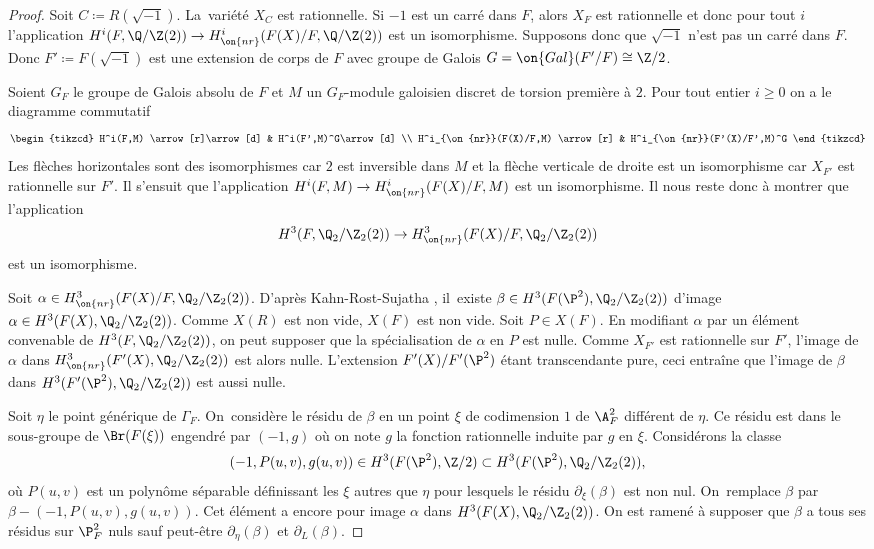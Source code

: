\begin{proof}
Soit $C\coloneqq R(\sqrt{-1})$. La~variété $X_{C}$ est rationnelle. Si $-1$ est un carré dans $F$, alors $X_F$ est rationnelle et donc pour tout $i$ l'application $H^i(F,\Q/\Z(2)) \to H^i_{\on{nr}}(F(X)/F,\Q/\Z(2))$ est un isomorphisme. Supposons donc que $\sqrt{-1}$ n'est pas un carré dans $F$. Donc $F'\coloneqq F(\sqrt{-1})$ est une extension de corps de $F$ avec groupe de Galois $G=\on{Gal}(F'/F)\cong \Z/2$.

Soient $G_F$ le groupe de Galois absolu de $F$ et $M$ un $G_F$-module galoisien discret de torsion première à $2$. Pour tout entier $i\geq 0$ on a le diagramme commutatif
\[
\begin{tikzcd}
H^i(F,M) \arrow[r]\arrow[d] & H^i(F',M)^G\arrow[d] \\
H^i_{\on{nr}}(F(X)/F,M) \arrow[r] & H^i_{\on{nr}}(F'(X)/F',M)^G
\end{tikzcd}
\]
Les flèches horizontales sont des isomorphismes car $2$ est inversible dans $M$ et la flèche verticale de droite est un isomorphisme car $X_{F'}$ est rationnelle sur $F'$. Il s'ensuit que l'application $H^i(F,M)\to H^i_{\on{nr}}(F(X)/F,M)$ est un isomorphisme.
Il nous reste donc à montrer que l'application \[H^3(F,\Q_2/\Z_2(2))\to H^3_{\on{nr}}(F(X)/F,\Q_2/\Z_2(2))\]
est un isomorphisme.

Soit $\alpha \in H^3_{\on{nr}}(F(X)/F,\Q_2/\Z_2(2))$. D'après Kahn-Rost-Sujatha \cite[Th.\,5]{kahn1998unramified}, il~existe $\beta \in H^3(F(\P^2), \Q_2/\Z_2(2))$ d'image $\alpha \in H^3(F(X),\Q_2/\Z_2(2))$. Comme $X(R)$ est non vide, $X(F)$ est non vide. Soit $P\in X(F)$. En modifiant $\alpha$ par un élément convenable de $H^3(F,\Q_2/\Z_2(2))$, on peut supposer que la spécialisation de $\alpha$ en $P$ est nulle. Comme $X_{F'}$ est rationnelle sur $F'$, l'image de $\alpha$ dans $H^3_{\on{nr}}(F'(X),\Q_2/\Z_2(2))$ est alors nulle. L'extension $F'(X)/F'(\P^2)$ étant transcendante pure, ceci entraîne que l'image de $\beta$ dans $H^3(F'(\P^2), \Q_2/\Z_2(2))$ est aussi nulle.

Soit $\eta$ le point générique de $\Gamma_F$. On~considère le résidu de $\beta$ en un point $\xi$
de codimension $1$ de $\A^2_{F}$ différent de $\eta$. Ce résidu est dans le sous-groupe de $\Br(F(\xi))$ engendré par $(-1,g)$ où on note $g$ la fonction rationnelle
induite par $g$ en $\xi$. Considérons la classe
\[(-1,P(u,v),g(u,v)) \in H^3(F(\P^2), \Z/2) \subset H^3(F(\P^2), \Q_2/\Z_2(2)),\]
où $P(u,v)$ est un polynôme séparable définissant
les $\xi$ autres que $\eta$ pour lesquels le résidu $\partial_{\xi}(\beta)$
est non nul. On~remplace $\beta$ par $\beta - (-1,P(u,v),g(u,v))$.
Cet élément a encore pour image $\alpha$ dans $H^3(F(X),\Q_2/\Z_2(2))$.
On est ramené à supposer que $\beta$ a tous ses résidus
sur $\P^2_{F}$ nuls sauf peut-être $\partial_{\eta}(\beta)$
et $\partial_{L}(\beta)$.


\end{proof}
